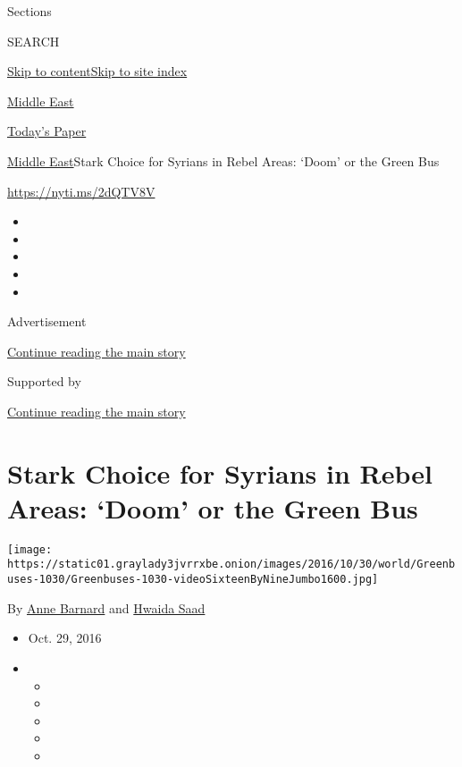 Sections

SEARCH

\protect\hyperlink{site-content}{Skip to
content}\protect\hyperlink{site-index}{Skip to site index}

\href{https://www.nytimes3xbfgragh.onion/section/world/middleeast}{Middle
East}

\href{https://myaccount.nytimes3xbfgragh.onion/auth/login?response_type=cookie\&client_id=vi}{}

\href{https://www.nytimes3xbfgragh.onion/section/todayspaper}{Today's
Paper}

\href{/section/world/middleeast}{Middle East}\textbar{}Stark Choice for
Syrians in Rebel Areas: `Doom' or the Green Bus

\url{https://nyti.ms/2dQTV8V}

\begin{itemize}
\item
\item
\item
\item
\item
\end{itemize}

Advertisement

\protect\hyperlink{after-top}{Continue reading the main story}

Supported by

\protect\hyperlink{after-sponsor}{Continue reading the main story}

\hypertarget{stark-choice-for-syrians-in-rebel-areas-doom-or-the-green-bus}{%
\section{Stark Choice for Syrians in Rebel Areas: `Doom' or the Green
Bus}\label{stark-choice-for-syrians-in-rebel-areas-doom-or-the-green-bus}}

\texttt{[image: https://static01.graylady3jvrrxbe.onion/images/2016/10/30/world/Greenbuses-1030/Greenbuses-1030-videoSixteenByNineJumbo1600.jpg]}

By \href{http://www.nytimes3xbfgragh.onion/by/anne-barnard}{Anne
Barnard} and
\href{https://www.nytimes3xbfgragh.onion/by/hwaida-saad}{Hwaida Saad}

\begin{itemize}
\item
  Oct. 29, 2016
\item
  \begin{itemize}
  \item
  \item
  \item
  \item
  \item
  \end{itemize}
\end{itemize}

